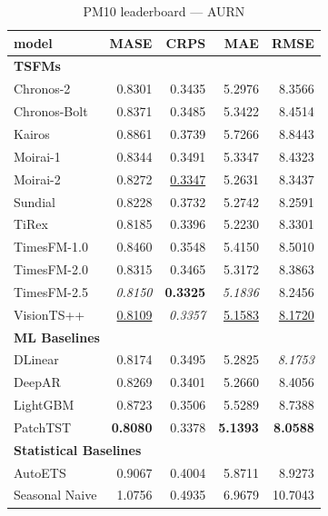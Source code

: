 \begin{table}[H]
\caption{PM10 leaderboard --- AURN}
\centering
\begin{small}
\begin{tabular}{lrrrr}
\toprule
model & MASE & CRPS & MAE & RMSE \\
\midrule
\multicolumn{5}{l}{\textbf{TSFMs}} \\
Chronos-2 & 0.8301 & 0.3435 & 5.2976 & 8.3566 \\
Chronos-Bolt & 0.8371 & 0.3485 & 5.3422 & 8.4514 \\
Kairos & 0.8861 & 0.3739 & 5.7266 & 8.8443 \\
Moirai-1 & 0.8344 & 0.3491 & 5.3347 & 8.4323 \\
Moirai-2 & 0.8272 & \underline{0.3347} & 5.2631 & 8.3437 \\
Sundial & 0.8228 & 0.3732 & 5.2742 & 8.2591 \\
TiRex & 0.8185 & 0.3396 & 5.2230 & 8.3301 \\
TimesFM-1.0 & 0.8460 & 0.3548 & 5.4150 & 8.5010 \\
TimesFM-2.0 & 0.8315 & 0.3465 & 5.3172 & 8.3863 \\
TimesFM-2.5 & \textit{0.8150} & \textbf{0.3325} & \textit{5.1836} & 8.2456 \\
VisionTS++ & \underline{0.8109} & \textit{0.3357} & \underline{5.1583} & \underline{8.1720} \\
\midrule
\multicolumn{5}{l}{\textbf{ML Baselines}} \\
DLinear & 0.8174 & 0.3495 & 5.2825 & \textit{8.1753} \\
DeepAR & 0.8269 & 0.3401 & 5.2660 & 8.4056 \\
LightGBM & 0.8723 & 0.3506 & 5.5289 & 8.7388 \\
PatchTST & \textbf{0.8080} & 0.3378 & \textbf{5.1393} & \textbf{8.0588} \\
\midrule
\multicolumn{5}{l}{\textbf{Statistical Baselines}} \\
AutoETS & 0.9067 & 0.4004 & 5.8711 & 8.9273 \\
Seasonal Naive & 1.0756 & 0.4935 & 6.9679 & 10.7043 \\
\bottomrule
\end{tabular}
\end{small}
\end{table}